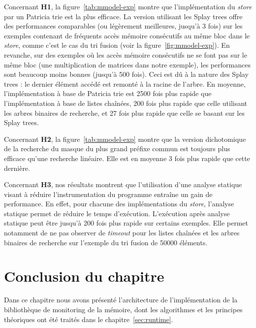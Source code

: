 Concernant \textbf{H1}, la figure~\ref{tab:mmodel-exp} montre que
l'implémentation du {\em store} par un Patricia trie est la plus efficace.
La version utilisant les Splay trees offre des performances comparables (ou
légèrement meilleures, jusqu'à 3 fois) sur les exemples contenant de fréquents
accès mémoire consécutifs au même bloc dans le {\em store}, comme c'est le cas
du tri fusion (voir la figure~\ref{fig:mmodel-exp}).
En revanche, sur des exemples où les accès mémoire consécutifs ne se font pas
sur le même bloc (une multiplication de matrices dans notre exemple), les
performances sont beaucoup moins bonnes (jusqu'à 500 fois).
Ceci est dû à la nature des Splay trees : le dernier élément accédé est remonté
à la racine de l'arbre.
En moyenne, l'implémentation à base de Patricia trie est 2500 fois plus rapide
que l'implémentation à base de listes chaînées, 200 fois plus rapide que celle
utilisant les arbres binaires de recherche, et 27 fois plus rapide que celle se
basant sur les Splay trees.

Concernant \textbf{H2}, la figure~\ref{tab:mmodel-exp} montre que la version
dichotomique de la recherche du masque du plus grand préfixe commun est toujours
plus efficace qu'une recherche linéaire.
Elle est en moyenne 3 fois plus rapide que cette dernière.

Concernant \textbf{H3}, nos résultats montrent que l'utilisation d'une analyse
statique visant à réduire l'instrumentation du programme entraîne un gain de
performance.
En effet, pour chacune des implémentations du {\em store}, l'analyse statique
permet de réduire le temps d'exécution.
L'exécution après analyse statique peut être jusqu'à 200 fois plus rapide sur
certains exemples.
Elle permet notamment de ne pas observer de {\em timeout} pour les listes
chaînées et les arbres binaires de recherche sur l'exemple du tri fusion de
50000 éléments.


\section*{Conclusion du chapitre}


Dans ce chapitre nous avons présenté l'architecture de l'implémentation de la
bibliothèque de monitoring de la mémoire, dont les algorithmes et les principes
théoriques ont été traités dans le chapitre~\ref{sec:runtime}.

